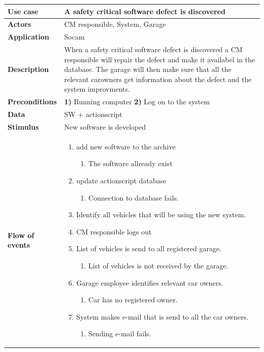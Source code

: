 	\begin{table}[H]
		\begin{tabular}{ p{4cm} | p{10cm} }
			\hline
			\rowcolor{gray}
			{\bf Use case} & {\bf A safety critical software defect is discovered} \\ \hline
			{\bf Actors} & CM responsible, System, Garage \\ \hline
			{\bf Application} & Socam \\ \hline
			{\bf Description} & When a safety critical software defect is discovered a CM 
			responsible will repair the defect and make it availabel in the database. 
			The garage will then make sure that all the relevant carowners get information 
			about the defect and the system improvments.\\ \hline
			{\bf Preconditions} & {\bf 1)} Running computer {\bf 2)} Log on to the system \\ \hline
			{\bf Data} & SW + actionscript \\ \hline
			{\bf Stimulus} & New software is developed \\ \hline
			{\bf Flow of events} & 
				\begin{enumerate}[font=\bfseries]
					\item add new software to the archive
						\begin{enumerate}[label*=\arabic*., font=\bfseries]
							\item The software allready exist 
						\end{enumerate}
					\item update actionscript database
						\begin{enumerate}[label*=\arabic*., font=\bfseries]
							\item Connection to database fails. 
						\end{enumerate}
					\item Identify all vehicles that will be using the new system.
					\item CM responsible logs out
					\item List of vehicles is send to all registered garage.
						\begin{enumerate}[label*=\arabic*., font=\bfseries]
							\item  List of vehicles is not received by the garage.
						\end{enumerate}
					\item Garage employee identifies relevant car owners.
						\begin{enumerate}[label*=\arabic*., font=\bfseries]
							\item Car has no registered owner.
						\end{enumerate}
					\item System makes e-mail that is send to all the car owners.
						\begin{enumerate}[label*=\arabic*., font=\bfseries]
							\item Sending e-mail fails.
						\end{enumerate}
				\end{enumerate}
			

\end{tabular}
\end{table}
